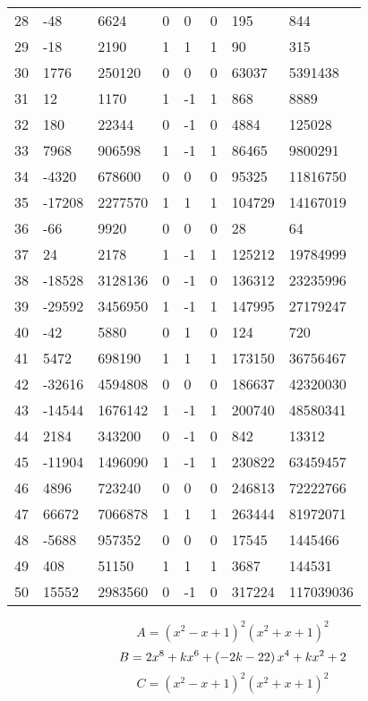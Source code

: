 \documentclass{amsart}
\begin{document}
\begin{longtable}{|l|l|l|lllll|}
28&-48&6624&0&0&0&195&844\\
29&-18&2190&1&1&1&90&315\\
30&1776&250120&0&0&0&63037&5391438\\
31&12&1170&1&-1&1&868&8889\\
32&180&22344&0&-1&0&4884&125028\\
33&7968&906598&1&-1&1&86465&9800291\\
34&-4320&678600&0&0&0&95325&11816750\\
35&-17208&2277570&1&1&1&104729&14167019\\
36&-66&9920&0&0&0&28&64\\
37&24&2178&1&-1&1&125212&19784999\\
38&-18528&3128136&0&-1&0&136312&23235996\\
39&-29592&3456950&1&-1&1&147995&27179247\\
40&-42&5880&0&1&0&124&720\\
41&5472&698190&1&1&1&173150&36756467\\
42&-32616&4594808&0&0&0&186637&42320030\\
43&-14544&1676142&1&-1&1&200740&48580341\\
44&2184&343200&0&-1&0&842&13312\\
45&-11904&1496090&1&-1&1&230822&63459457\\
46&4896&723240&0&0&0&246813&72222766\\
47&66672&7066878&1&1&1&263444&81972071\\
48&-5688&957352&0&0&0&17545&1445466\\
49&408&51150&1&1&1&3687&144531\\
50&15552&2983560&0&-1&0&317224&117039036\\
\hline
\end{longtable}
$$A=(x^2
 - x
 + 1)^{2}(x^2
 + x
 + 1)^{2}$$
$$B=2\*x^8
 + k\*x^6
 + \left(-2\*k
 - 22\right) \*x^4
 + k\*x^2
 + 2$$
$$C=(x^2
 - x
 + 1)^{2}(x^2
 + x
 + 1)^{2}$$
\end{document}
